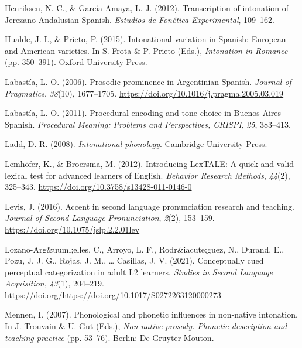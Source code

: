\documentclass[]{article}
\newlength{\cslhangindent}
\newenvironment{CSLReferences}[2] %
 {%
  \setlength{\parindent}{0pt}
  \ifodd #1 \everypar{\setlength{\hangindent}{\cslhangindent}}\ignorespaces\fi
  \ifnum #2 > 0
  \setlength{\parskip}{#2\baselineskip}
  \fi
 }%
 {}
\begin{document}
\begin{CSLReferences}{1}{0}
\leavevmode{}%
Henriksen, N. C., \& García-Amaya, L. J. (2012). Transcription of intonation of {J}erezano {A}ndalusian {S}panish. \emph{Estudios de {F}onética {E}xperimental}, 109--162.

\leavevmode{}%
Hualde, J. I., \& Prieto, P. (2015). Intonational variation in {S}panish: {E}uropean and {A}merican varieties. In S. Frota \& P. Prieto (Eds.), \emph{Intonation in {R}omance} (pp. 350--391). Oxford University Press.

\leavevmode{}%
Labastía, L. O. (2006). Prosodic prominence in {A}rgentinian {S}panish. \emph{Journal of Pragmatics}, \emph{38}(10), 1677--1705. \url{https://doi.org/10.1016/j.pragma.2005.03.019}

\leavevmode{}%
Labastía, L. O. (2011). Procedural encoding and tone choice in {Buenos Aires Spanish}. \emph{Procedural Meaning: Problems and Perspectives, CRISPI}, \emph{25}, 383--413.

\leavevmode{}%
Ladd, D. R. (2008). \emph{Intonational phonology}. Cambridge University Press.

\leavevmode{}%
Lemhöfer, K., \& Broersma, M. (2012). Introducing LexTALE: A quick and valid lexical test for advanced learners of {E}nglish. \emph{Behavior Research Methods}, \emph{44}(2), 325--343. \url{https://doi.org/10.3758/s13428-011-0146-0}

\leavevmode{}%
Levis, J. (2016). Accent in second language pronunciation research and teaching. \emph{Journal of Second Language Pronunciation}, \emph{2}(2), 153--159. \url{https://doi.org/10.1075/jslp.2.2.01lev}

\leavevmode{}%
Lozano-Arg\&uuml;elles, C., Arroyo, L. F., Rodr\&iacute;guez, N., Durand, E., Pozu, J. J. G., Rojas, J. M., \ldots{} Casillas, J. V. (2021). Conceptually cued perceptual categorization in adult {L}2 learners. \emph{Studies in Second Language Acquisition}, \emph{43}(1), 204--219. https://doi.org/\url{https://doi.org/10.1017/S0272263120000273}

\leavevmode{}%
Mennen, I. (2007). Phonological and phonetic influences in non-native intonation. In J. Trouvain \& U. Gut (Eds.), \emph{Non-native prosody. Phonetic description and teaching practice} (pp. 53--76). Berlin: De Gruyter Mouton.


\end{CSLReferences}
\end{document}
